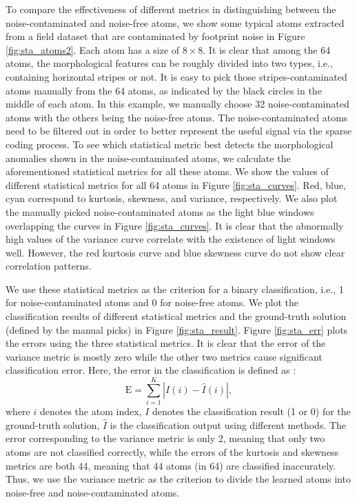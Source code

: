 To compare the effectiveness of different metrics in distinguishing between the noise-contaminated and noise-free atoms, we show some typical atoms extracted from a field dataset that are contaminated by footprint noise in Figure \ref{fig:sta_atoms2}. Each atom has a size of $8\times 8$. It is clear that among the 64 atoms, the morphological features can be roughly divided into two types, i.e.,  containing horizontal stripes or not. It is easy to pick those stripes-contaminated atoms manually from the 64 atoms, as indicated by the black circles in the middle of each atom. In this example, we manually choose 32 noise-contaminated atoms with the others being the noise-free atoms. The noise-contaminated atoms need to be filtered out in order to better represent the useful signal via the sparse coding process. To see which statistical metric best detects the morphological anomalies shown in the noise-contaminated atoms, we calculate the aforementioned statistical metrics for all these atoms. We show the values of different statistical metrics for all 64 atoms in Figure \ref{fig:sta_curves}. Red, blue, cyan correspond to kurtosis, skewness, and variance, respectively. We also plot the manually picked noise-contaminated atoms as the light blue windows overlapping the curves in Figure \ref{fig:sta_curves}. It is clear that the abnormally high values of the variance curve correlate with the existence of light windows well. However, the red kurtosis curve and blue skewness curve do not show clear correlation patterns. 

We use these statistical metrics as the criterion for a binary classification, i.e., 1 for noise-contaminated atoms and 0 for noise-free atoms. We plot the classification results of different statistical metrics and the ground-truth solution (defined by the manual picks) in Figure \ref{fig:sta_result}.  Figure \ref{fig:sta_err} plots the errors using the three statistical metrics. It is clear that the error of the variance metric is mostly zero while the other two metrics cause significant classification error. Here, the error in the classification is defined as \cite{yangkang2018gji}:
\begin{equation}
\label{eq:err}
\text{E} = \sum_{i=1}^{K} |I(i) - \hat{I}(i) |,
\end{equation}
where $i$ denotes the atom index, $I$ denotes the classification result (1 or 0) for the ground-truth solution, $\hat{I}$ is the classification output using different methods. The error corresponding to the variance metric is only 2,  meaning that only two atoms are not classified correctly, while the errors of the kurtosis and skewness metrics are both 44, meaning that 44 atoms (in 64) are classified inaccurately.  Thus, we use the variance metric as the criterion to divide the learned atoms into noise-free and noise-contaminated atoms. 

